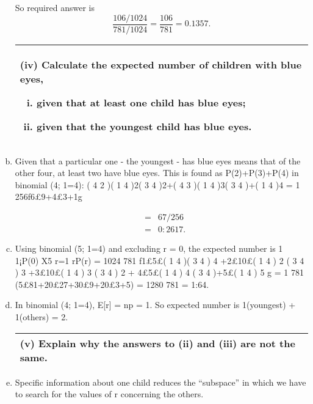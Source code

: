 \documentclass[a4paper,12pt]{article}
\begin{document}
\begin{enumerate}[(a)]
So required answer is \[ \frac{106/1024}{781/1024} = \frac{106}{781} = 0.1357. \]

  \begin{table}[ht!]
     \centering
     \begin{tabular}{|p{15cm}|}
     \hline  
(iv) Calculate the expected number of children with blue eyes,
\begin{enumerate}[(i)]
\item given that at least one child has blue eyes;
\item given that the youngest child has blue eyes.
\end{enumerate}
\\ \hline
      \end{tabular}
    \end{table}
\item Given that a particular one - the youngest - has blue eyes means that of the
other four, at least two have blue eyes. This is found as P(2)+P(3)+P(4) in
binomial (4; 1=4): ( 4
2 )( 1
4 )2( 3
4 )2+( 4
3 )( 1
4 )3( 3
4 )+( 1
4 )4 = 1
256f6£9+4£3+1g


\begin{eqnarray*}
 &=& 67/256 \\
 &=& 0:2617.
\end{eqnarray*}

\item  Using binomial (5; 1=4) and excluding r = 0, the expected number is
1
1¡P(0)
X5
r=1
rP(r) =
1024
781
f1£5£(
1
4
)(
3
4
)
4
+2£10£(
1
4
)
2
(
3
4
)
3
+3£10£(
1
4
)
3
(
3
4
)
2
+
4£5£(
1
4
)
4
(
3
4
)+5£(
1
4
)
5
g =
1
781
(5£81+20£27+30£9+20£3+5) =
1280
781
= 1:64.




\item In binomial (4; 1=4), E[r] = np = 1.
So expected number is 1(youngest) + 1(others) = 2.
  \begin{table}[ht!]
     \centering
     \begin{tabular}{|p{15cm}|}
     \hline     
(v) Explain why the answers to (ii) and (iii) are not the same.\\ \hline
      \end{tabular}
    \end{table}
\item Specific information about one child reduces the “subspace” in which we
have to search for the values of r concerning the others.
\end{enumerate}
\end{document}

